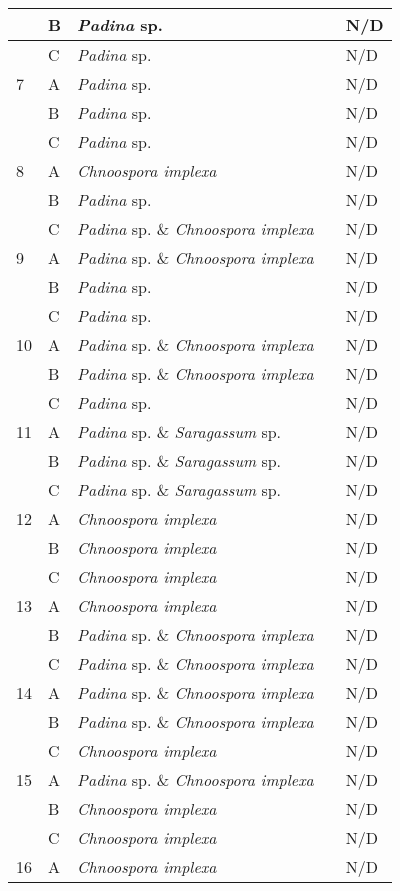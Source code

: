\documentclass[12pt]{article}
\begin{document}
\begin{longtable}{ | p{1cm} | p{1cm} | p{3cm} | p{4cm} | p{4cm} | }
&B&\emph{Padina} sp.&&N/D\\
\hline
&C&\emph{Padina} sp.&&N/D\\
\hline
7&A&\emph{Padina} sp.&&N/D\\
\hline
&B&\emph{Padina} sp.&&N/D\\
\hline
&C&\emph{Padina} sp.&&N/D\\
\hline
8&A&\emph{Chnoospora implexa}&&N/D\\
\hline
&B&\emph{Padina} sp.&&N/D\\
\hline
&C&\emph{Padina} sp. \& \emph{Chnoospora implexa}&&N/D\\
\hline
9&A&\emph{Padina} sp. \& \emph{Chnoospora implexa}&&N/D\\
\hline
&B&\emph{Padina} sp.&&N/D\\
\hline
&C&\emph{Padina} sp.&&N/D\\
\hline
10&A&\emph{Padina} sp. \& \emph{Chnoospora implexa}&&N/D\\
\hline
&B&\emph{Padina} sp. \& \emph{Chnoospora implexa}&&N/D\\
\hline
&C&\emph{Padina} sp.&&N/D\\
\hline
11&A&\emph{Padina} sp. \& \emph{Saragassum} sp.&&N/D\\
\hline
&B&\emph{Padina} sp. \& \emph{Saragassum} sp.&&N/D\\
\hline
&C&\emph{Padina} sp. \& \emph{Saragassum} sp.&&N/D\\
\hline
12&A&\emph{Chnoospora implexa}&&N/D\\
\hline
&B&\emph{Chnoospora implexa}&&N/D\\
\hline
&C&\emph{Chnoospora implexa}&&N/D\\
\hline
13&A&\emph{Chnoospora implexa}&&N/D\\
\hline
&B&\emph{Padina} sp. \& \emph{Chnoospora implexa}&&N/D\\
\hline
&C&\emph{Padina} sp. \& \emph{Chnoospora implexa}&&N/D\\
\hline
14&A&\emph{Padina} sp. \& \emph{Chnoospora implexa}&&N/D\\
\hline
&B&\emph{Padina} sp. \& \emph{Chnoospora implexa}&&N/D\\
\hline
&C&\emph{Chnoospora implexa}&&N/D\\
\hline
15&A&\emph{Padina} sp. \& \emph{Chnoospora implexa}&&N/D\\
\hline
&B&\emph{Chnoospora implexa}&&N/D\\
\hline
&C&\emph{Chnoospora implexa}&&N/D\\
\hline
16&A&\emph{Chnoospora implexa}&&N/D\\

\end{longtable}
\end{document}
